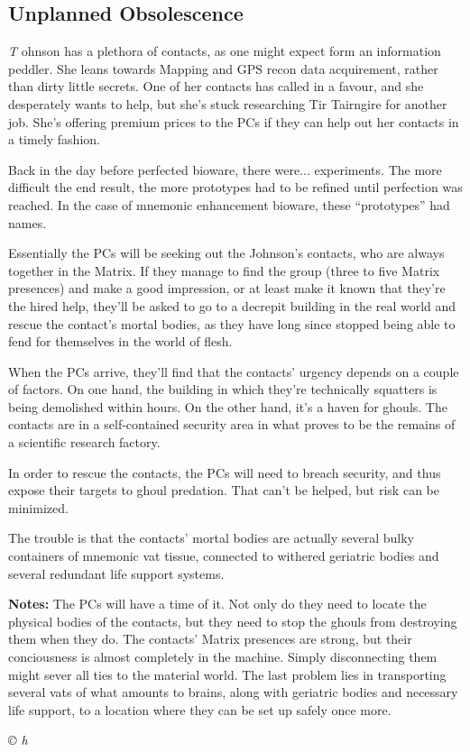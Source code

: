 \documentclass[letterpaper,onecolumn,10pt]{article}
\renewcommand{\textsc}[1]{{\fontspec{Friz Quadrata SC TT}\selectfont #1}}
\newcommand{\getyear}[1]{\StrLeft{#1}{4}}
\newenvironment{scenario}[6]
	{
		\section[#1 {\small\textsc{[#2]}}]{#1} \nopagebreak

		\noindent{\textsc{#2}}\nopagebreak

		\noindent\textit{#3}\nopagebreak
		\def\TMPSCENARIO{{\small\textit{©\getyear{#5}{} #4}}}
	}
	{\TMPSCENARIO}
\newcommand{\sectionlabel}[1]{\textbf{#1: }}
\newcommand{\synopsis}{\sectionlabel{Synopsis}}
\newcommand{\notes}{\sectionlabel{Notes}}
\begin{document}
\begin{multicols}{2}
\begin{scenario}{Unplanned Obsolescence}
\synopsis The Johnson has a plethora of contacts, as one might expect form an information peddler. She leans towards Mapping and GPS recon data acquirement, rather than dirty little secrets. One of her contacts has called in a favour, and she desperately wants to help, but she's stuck researching Tir Tairngire for another job. She's offering premium prices to the PCs if they can help out her contacts in a timely fashion.

Back in the day before perfected bioware, there were... experiments. The more difficult the end result, the more prototypes had to be refined until perfection was reached. In the case of mnemonic enhancement bioware, these ``prototypes'' had names.

Essentially the PCs will be seeking out the Johnson's contacts, who are always together in the Matrix. If they manage to find the group (three to five Matrix presences) and make a good impression, or at least make it known that they're the hired help, they'll be asked to go to a decrepit building in the real world and rescue the contact's mortal bodies, as they have long since stopped being able to fend for themselves in the world of flesh.

When the PCs arrive, they'll find that the contacts' urgency depends on a couple of factors. On one hand, the building in which they're technically squatters is being demolished within hours. On the other hand, it's a haven for ghouls. The contacts are in a self-contained security area in what proves to be the remains of a scientific research factory.

In order to rescue the contacts, the PCs will need to breach security, and thus expose their targets to ghoul predation. That can't be helped, but risk can be minimized.

The trouble is that the contacts' mortal bodies are actually several bulky containers of mnemonic vat tissue, connected to withered geriatric bodies and several redundant life support systems.

\notes The PCs will have a time of it. Not only do they need to locate the physical bodies of the contacts, but they need to stop the ghouls from destroying them when they do. The contacts' Matrix presences are strong, but their conciousness is almost completely in the machine. Simply disconnecting them might sever all ties to the material world. The last problem lies in transporting several vats of what amounts to brains, along with geriatric bodies and necessary life support, to a location where they can be set up safely once more.


\end{scenario}
\end{multicols}
\end{document}
